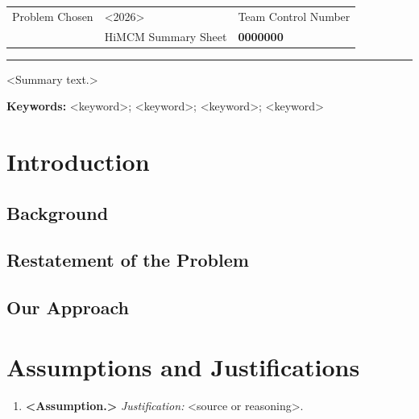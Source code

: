 \documentclass[12pt]{article}
\newcommand{\teamnumber}{0000000}   %
\newcommand{\problemletter}{<A>}
\newcommand{\contestyear}{<2026>}
\newcommand{\papertitle}{<An Informative, Specific Title>}
\begin{document}
\thispagestyle{fancy}
\begin{center}
\begin{tabular}{>{\centering\arraybackslash}p{}
                >{\centering\arraybackslash}p{}
                >{\centering\arraybackslash}p{}}
Problem Chosen & \contestyear & Team Control Number \\
{\Large\bfseries \problemletter} & HiMCM Summary Sheet & {\Large\bfseries \teamnumber} \\
\end{tabular}
\end{center}
\vspace{-6pt}\noindent\rule{\textwidth}{0.8pt}
\begin{center}{\large\bfseries \papertitle}\end{center}

<Summary text.>

\medskip\noindent\textbf{Keywords:} <keyword>; <keyword>; <keyword>; <keyword>

\newpage
\tableofcontents
\newpage

\section{Introduction}
\subsection{Background}
\subsection{Restatement of the Problem}
\subsection{Our Approach}  %

\section{Assumptions and Justifications}
\begin{enumerate}[label=\textbf{A\arabic*.},leftmargin=*]
  \item \textbf{<Assumption.>} \emph{Justification:} <source or reasoning>.
\end{enumerate}
\end{document}
